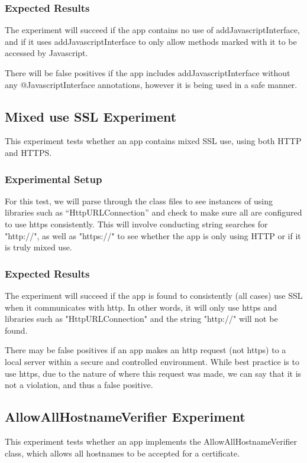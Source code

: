 \documentclass[10pt,twocolumn,pdftex]{article}
\begin{document}
    \subsubsection{Expected Results}
    The experiment will succeed if the app contains no use of addJavascriptInterface, and if it uses addJavascriptInterface to only allow methods marked with it to be accessed by Javascript.

    There will be false positives if the app includes addJavascriptInterface without any @JavascriptInterface annotations, however it is being used in a safe manner.


\subsection{Mixed use SSL Experiment}
    This experiment tests whether an app contains mixed SSL use, using both HTTP and HTTPS. 
    
    \subsubsection{Experimental Setup}
    For this test, we will parse through the class files to see instances of using libraries such as “HttpURLConnection” and check to make sure all are configured to use https consistently. This will involve conducting string searches for "http://", as well as "https://" to see whether the app is only using HTTP or if it is truly mixed use. 
    
    \subsubsection{Expected Results}
    The experiment will succeed if the app is found to consistently (all cases) use SSL when it communicates with http. In other words, it will only use https and libraries such as "HttpURLConnection" and the string "http://" will not be found. 
    
    There may be false positives if an app makes an http request (not https) to a local server within a secure and controlled environment. While best practice is to use https, due to the nature of where this request was made, we can say that it is not a violation, and thus a false positive.
    
    
\subsection{AllowAllHostnameVerifier Experiment}
    This experiment tests whether an app implements the AllowAllHostnameVerifier class, which allows all hostnames to be accepted for a certificate.
    
\end{document}
